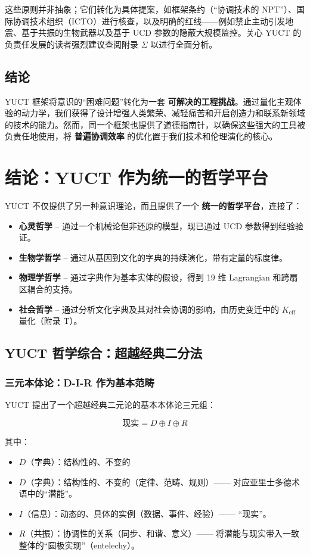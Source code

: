 \documentclass[12pt,a4paper]{article}
\newcommand{\eff}{\mathrm{eff}}
\newcommand{\Ke}{K_{\eff}}
\begin{document}
	这些原则并非抽象；它们转化为具体提案，如框架条约（“协调技术的 NPT”）、国际协调技术组织（ICTO）进行核查，以及明确的红线——例如禁止主动引发地震、基于共振的生物武器以及基于 UCD 参数的隐蔽大规模监控。关心 YUCT 的负责任发展的读者强烈建议查阅附录 \(\Sigma\) 以进行全面分析。
	
	\subsection{结论}
	YUCT 框架将意识的“困难问题”转化为一套 \textbf{可解决的工程挑战}。通过量化主观体验的动力学，我们获得了设计增强人类繁荣、减轻痛苦和开启创造力和联系新领域的技术的能力。然而，同一个框架也提供了道德指南针，以确保这些强大的工具被负责任地使用，将 \textbf{普遍协调效率} 的优化置于我们技术和伦理演化的核心。
	
	\section{结论：YUCT 作为统一的哲学平台}
	
	YUCT 不仅提供了另一种意识理论，而且提供了一个 \textbf{统一的哲学平台}，连接了：
	\begin{itemize}
		\item \textbf{心灵哲学} – 通过一个机械论但非还原的模型，现已通过 UCD 参数得到经验验证。
		\item \textbf{生物学哲学} – 通过从基因到文化的字典的持续演化，带有定量的标度律。
		\item \textbf{物理学哲学} – 通过字典作为基本实体的假设，得到 19 维 Lagrangian 和跨扇区耦合的支持。
		\item \textbf{社会哲学} – 通过分析文化字典及其对社会协调的影响，由历史变迁中的 $\Ke$ 量化（附录 T）。
	\end{itemize}
	
	\subsection{YUCT 哲学综合：超越经典二分法}
	
	\subsubsection{三元本体论：D-I-R 作为基本范畴}
	
	YUCT 提出了一个超越经典二元论的基本本体论三元组：
	
	\[
	\text{现实} = D \oplus I \oplus R
	\]
	
	其中：
	\begin{itemize}
		\item $D$（字典）：结构性的、不变的
				\item $D$（字典）：结构性的、不变的（定律、范畴、规则）—— 对应亚里士多德术语中的“潜能”。
		\item $I$（信息）：动态的、具体的实例（数据、事件、经验）—— “现实”。
		\item $R$（共振）：协调性的关系（同步、和谐、意义）—— 将潜能与现实带入一致整体的“圆极实现”（entelechy）。
		\end{itemize}
		
\end{document}
